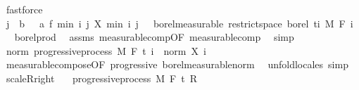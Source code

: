 \begin{isabellebody}
\ fastforce\isanewline
\ \ \isamarkupfalse%
\ \isamarkupfalse%
\ {\isachardoublequoteopen}{\isacharparenleft}{\kern0pt}{\isasymlambda}{\isacharparenleft}{\kern0pt}j\ {\isacharcolon}{\kern0pt}{\isacharcolon}{\kern0pt}\ {\isacharprime}{\kern0pt}b{\isacharcomma}{\kern0pt}\ {\isasymxi}\ {\isacharcolon}{\kern0pt}{\isacharcolon}{\kern0pt}\ {\isacharprime}{\kern0pt}a{\isacharparenright}{\kern0pt}{\isachardot}{\kern0pt}\ f\ {\isacharparenleft}{\kern0pt}min\ i\ j{\isacharparenright}{\kern0pt}\ {\isacharparenleft}{\kern0pt}X\ {\isacharparenleft}{\kern0pt}min\ i\ j{\isacharparenright}{\kern0pt}\ {\isasymxi}{\isacharparenright}{\kern0pt}{\isacharparenright}{\kern0pt}\ {\isasymin}\ borel{\isacharunderscore}{\kern0pt}measurable\ {\isacharparenleft}{\kern0pt}restrict{\isacharunderscore}{\kern0pt}space\ borel\ {\isacharbraceleft}{\kern0pt}ti{\isacharbraceright}{\kern0pt}\ {\isasymOtimes}\isactrlsub M\ F\ i{\isacharparenright}{\kern0pt}{\isachardoublequoteclose}\ \isamarkupfalse%
\ borel{\isacharunderscore}{\kern0pt}prod\ \isamarkupfalse%
\ assms\ measurable{\isacharunderscore}{\kern0pt}comp{\isacharbrackleft}{\kern0pt}OF\ measurable{\isacharunderscore}{\kern0pt}comp{\isacharbrackright}{\kern0pt}\ \isamarkupfalse%
\ simp\isanewline
{}\isamarkupfalse%
%
\endisatagproof
{\isafoldproof}%
%
\isadelimproof
\isanewline
%
\endisadelimproof
\isanewline
{}\isamarkupfalse%
\ norm{\isacharcolon}{\kern0pt}\ {\isachardoublequoteopen}progressive{\isacharunderscore}{\kern0pt}process\ M\ F\ t\ {\isacharparenleft}{\kern0pt}{\isasymlambda}i\ {\isasymxi}{\isachardot}{\kern0pt}\ norm\ {\isacharparenleft}{\kern0pt}X\ i\ {\isasymxi}{\isacharparenright}{\kern0pt}{\isacharparenright}{\kern0pt}{\isachardoublequoteclose}%
\isadelimproof
\ %
\endisadelimproof
%
\isatagproof
{}\isamarkupfalse%
\ measurable{\isacharunderscore}{\kern0pt}compose{\isacharbrackleft}{\kern0pt}OF\ progressive\ borel{\isacharunderscore}{\kern0pt}measurable{\isacharunderscore}{\kern0pt}norm{\isacharbrackright}{\kern0pt}\ \isamarkupfalse%
\ {\isacharparenleft}{\kern0pt}unfold{\isacharunderscore}{\kern0pt}locales{\isacharparenright}{\kern0pt}\ simp%
\endisatagproof
{\isafoldproof}%
%
\isadelimproof
%
\endisadelimproof
\isanewline
\isanewline
{}\isamarkupfalse%
\ scaleR{\isacharunderscore}{\kern0pt}right{\isacharcolon}{\kern0pt}\isanewline
\ \ \ {\isachardoublequoteopen}progressive{\isacharunderscore}{\kern0pt}process\ M\ F\ t\ R{\isachardoublequoteclose}\isanewline

\end{isabellebody}

